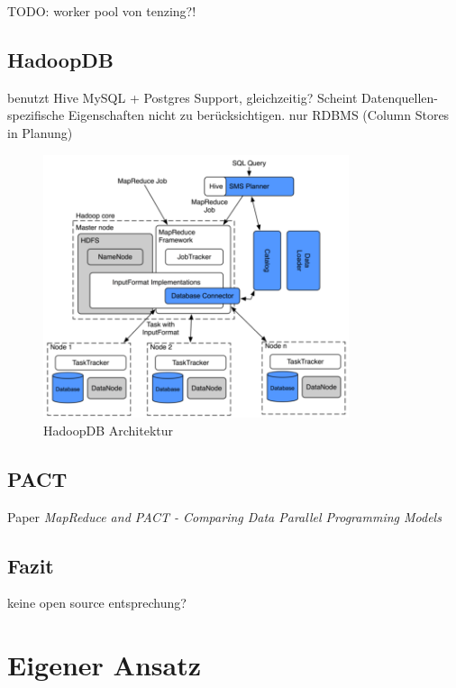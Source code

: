 \documentclass[a4paper]{article}
\begin{document}
TODO: worker pool von tenzing?!

\subsection{HadoopDB}
\cite{HadoopDB2009}
benutzt Hive
MySQL + Postgres Support, gleichzeitig?
Scheint Datenquellen-spezifische Eigenschaften nicht zu berücksichtigen. nur RDBMS (Column Stores in Planung)

\begin{figure}[H]
\centering
\includegraphics[width=0.8\textwidth]{hadoopdb-architecture.png}
\caption{HadoopDB Architektur \cite{HadoopDB2010}}
\label{fig:hadoopdb}
\end{figure}

\subsection{PACT}
Paper \textit{MapReduce and PACT - Comparing Data Parallel Programming Models} \cite{PACT}

\subsection{Fazit}
keine open source entsprechung?

\newpage
\section{Eigener Ansatz}

\newpage
\nocite{GOOGLE-TENZING}
\nocite{GOOGLE-MAPREDUCE}
\nocite{GOOGLE-GFS}
\nocite{KemperEickler}
\nocite{KandziaKlein}
\nocite{Selinger}
\nocite{Zeller}
\nocite{Ioannidis}
\printbibliography

\newpage
{}
\listoffigures

\listoftables

\renewcommand\listoflistingscaption{Quellcodeverzeichnis}
\listoflistings
\end{document}
